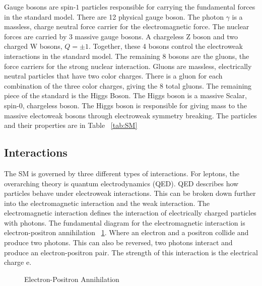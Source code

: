 \indent Gauge bosons are spin-${1}$ particles responsible for carrying the fundamental forces in the standard model. There are 12 physical gauge boson. The photon ${\gamma}$ is a massless, charge neutral force carrier for the electromagnetic force. The nuclear forces are carried by 3 massive gauge bosons. A chargeless Z boson and two charged W bosons, ${Q = \pm 1}$. Together, these 4 bosons control the electroweak interactions in the standard model. The remaining 8 bosons are the gluons, the force carriers for the strong nuclear interaction. Gluons are massless, electrically neutral particles that have two color charges. There is a gluon for each combination of the three color charges, giving the 8 total gluons. \linebreak
\indent The remaining piece of the standard is the Higgs Boson. The Higgs boson is a massive Scalar, spin-${0}$, chargeless boson. The Higgs boson is responsible for giving mass to the massive electoweak bosons through electroweak symmetry breaking. The particles and their properties are in Table ~\ref{tab:SM}\linebreak
\subsection{Interactions}
The SM is governed by three different types of interactions. For leptons, the overarching theory is quantum electrodynamics (QED). QED describes how particles behave under electroweak interactions. This can be broken down further into the electromagnetic interaction and the weak interaction. The electromagnetic interaction defines the interaction of electrically charged particles with photons. The fundamental diagram for the electromagnetic interaction is electron-positron annihilation ~\ref{Fey:e-p}. Where an electron and a positron collide and produce two photons. This can also be reversed, two photons interact and produce an electron-positron pair. The strength of this interaction is the electrical charge e. \linebreak

\begin{figure}[h]

\begin{center}
\caption{Electron-Positron Annihilation}
\label{Fey:e-p}
\end{center}
\end{figure}

